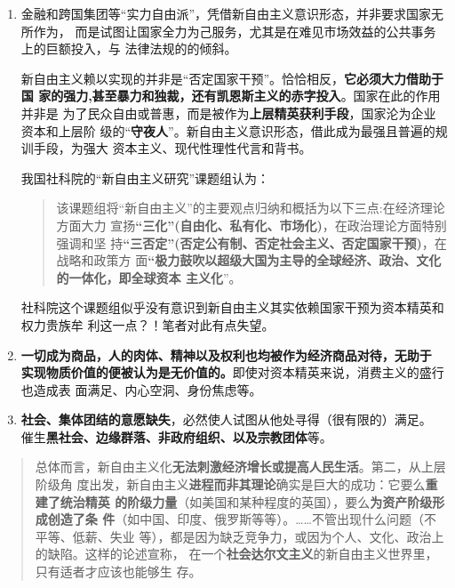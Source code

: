 \begin{enumerate}
\item 金融和跨国集团等“实力自由派”，凭借新自由主义意识形态，并非要求国家无所作为，
  而是试图让国家全力为己服务，尤其是在难见市场效益的公共事务上的巨额投入，与
  法律法规的的倾斜。

  新自由主义赖以实现的并非是“否定国家干预”。恰恰相反，\textbf{它必须大力借助于国
    家的强力,甚至暴力和独裁，还有凯恩斯主义的赤字投入}。国家在此的作用并非是
  为了民众自由或普惠，而是被作为\textbf{上层精英获利手段}，国家沦为企业资本和上层阶
  级的“\textbf{守夜人}”。新自由主义意识形态，借此成为最强且普遍的规训手段，为强大
  资本主义、现代性理性代言和背书。

  我国社科院的“新自由主义研究”课题组认为：
  \begin{quotation}
    该课题组将“新自由主义”的主要观点归纳和概括为以下三点:在经济理论方面大力
    宣扬\textbf{“三化”(自由化、私有化、市场化)}，在政治理论方面特别强调和坚
    持\textbf{“三否定”(否定公有制、否定社会主义、否定国家干预)}，在战略和政策方
    面\textbf{“极力鼓吹以超级大国为主导的全球经济、政治、文化的一体化，即全球资本
      主义化}”。\cite{newneo}
  \end{quotation}
  社科院这个课题组似乎没有意识到新自由主义其实依赖国家干预为资本精英和权力贵族牟
  利这一点？！笔者对此有点失望。

\item \textbf{一切成为商品，人的肉体、精神以及权利也均被作为经济商品对待，无助于
    实现物质价值的便被认为是无价值的。}即使对资本精英来说，消费主义的盛行也造成表
  面满足、内心空洞、身份焦虑等。

\item \textbf{社会、集体团结的意愿缺失}，必然使人试图从他处寻得（很有限的）满足。
  催生\textbf{黑社会、边缘群落、非政府组织、以及宗教团体}等。

\end{enumerate}

\begin{quotation}
  总体而言，新自由主义化\textbf{无法刺激经济增长或提高人民生活}。第二，从上层阶级角
  度出发，新自由主义\textbf{进程而非其理论}确实是巨大的成功：它要么\textbf{重建了统治精英
    的阶级力量}（如美国和某种程度的英国），要么\textbf{为资产阶级形成创造了条
    件}（如中国、印度、俄罗斯等等）。……不管出现什么问题（不平等、低薪、失业
  等），都是因为缺乏竞争力，或因为个人、文化、政治上的缺陷。这样的论述宣称，
  在一个\textbf{社会达尔文主义}的新自由主义世界里，只有适者才应该也能够生
  存。
\end{quotation}

